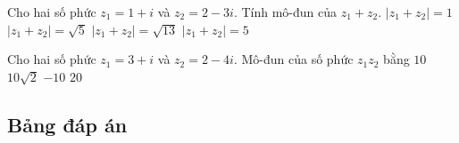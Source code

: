 \begin{ex}%
	Cho hai số phức $z_1=1+i$ và $z_2=2-3i$. Tính mô-đun của $z_1+z_2$.
	\choice
	{$|z_1+z_2|=1$}
	{$|z_1+z_2|=\sqrt{5}$}
	{\True $|z_1+z_2|=\sqrt{13}$}
	{$|z_1+z_2|=5$}
\end{ex}

\begin{ex}%
	Cho hai số phức $z_1=3+i$ và $z_2=2-4i$. Mô-đun của số phức $z_1z_2$ bằng
	\choice
	{$10$}
	{\True $10\sqrt{2}$}
	{$-10$}
	{$20$}
\end{ex}
\subsection{Bảng đáp án}


